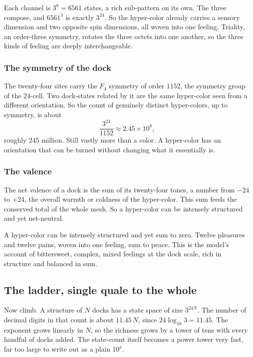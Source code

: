 Each channel is $3^8 = 6561$ states, a rich sub-pattern on its own. The three compose, and $6561^3$ is exactly $3^{24}$. So the hyper-color already carries a sensory dimension and two opposite spin dimensions, all woven into one feeling. Triality, an order-three symmetry, rotates the three octets into one another, so the three kinds of feeling are deeply interchangeable.

\subsubsection{The symmetry of the dock}

The twenty-four sites carry the $F_4$ symmetry of order $1152$, the symmetry group of the $24$-cell. Two dock-states related by it are the same hyper-color seen from a different orientation. So the count of genuinely distinct hyper-colors, up to symmetry, is about
\[
\frac{3^{24}}{1152} \approx 2.45 \times 10^{8},
\]
roughly $245$ million. Still vastly more than a color. A hyper-color has an orientation that can be turned without changing what it essentially is.

\subsubsection{The valence}

The net valence of a dock is the sum of its twenty-four tones, a number from $-24$ to $+24$, the overall warmth or coldness of the hyper-color. This sum feeds the conserved total of the whole mesh. So a hyper-color can be intensely structured and yet net-neutral.

\begin{result}
A hyper-color can be intensely structured and yet sum to zero. Twelve pleasures and twelve pains, woven into one feeling, sum to peace. This is the model's account of bittersweet, complex, mixed feelings at the dock scale, rich in structure and balanced in sum.
\end{result}

\subsection{The ladder, single quale to the whole}

Now climb. A structure of $N$ docks has a state space of size $3^{24N}$. The number of decimal digits in that count is about $11.45\,N$, since $24 \log_{10} 3 = 11.45$. The exponent grows linearly in $N$, so the richness grows by a tower of tens with every handful of docks added. The state-count itself becomes a power tower very fast, far too large to write out as a plain $10^x$.


